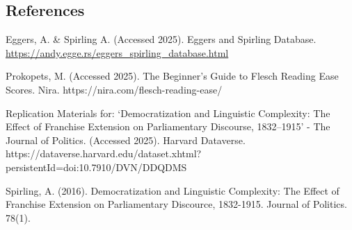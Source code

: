 \documentclass[
  letterpaper,
  DIV=11,
  numbers=noendperiod]{scrartcl}
\begin{document}
\subsection{References}\label{references}

Eggers, A. \& Spirling A. (Accessed 2025). Eggers and Spirling Database.
\url{https://andy.egge.rs/eggers_spirling_database.html}

Prokopets, M. (Accessed 2025). The Beginner's Guide to Flesch Reading
Ease Scores. Nira. https://nira.com/flesch-reading-ease/

Replication Materials for: `Democratization and Linguistic Complexity:
The Effect of Franchise Extension on Parliamentary Discourse,
1832--1915' - The Journal of Politics. (Accessed 2025). Harvard
Dataverse.
https://dataverse.harvard.edu/dataset.xhtml?persistentId=doi:10.7910/DVN/DDQDMS

Spirling, A. (2016). Democratization and Linguistic Complexity: The
Effect of Franchise Extension on Parliamentary Discource, 1832-1915.
Journal of Politics. 78(1).
\end{document}
